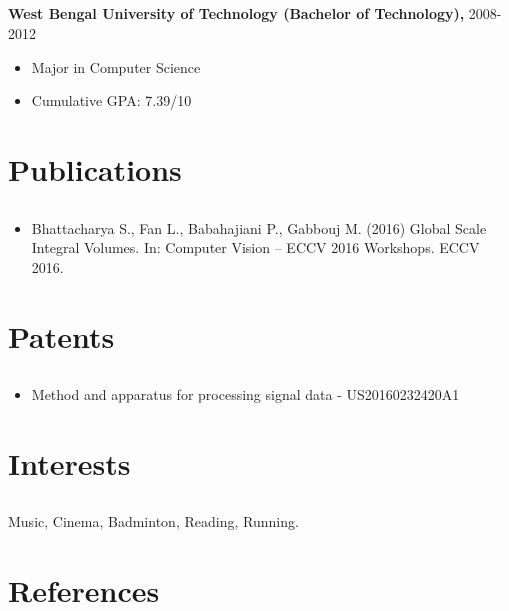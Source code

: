 \documentclass{article}
\begin{document}
\subsection{}
\textbf{West Bengal University of Technology (Bachelor of Technology),} 2008-2012
\begin{itemize}[label={--}]
  \itemsep0em 
  \item Major in Computer Science
  \item Cumulative GPA: 7.39/10
\end{itemize}


\section{Publications}
\subsection{}
\begin{itemize}[label={--}]
  \itemsep0em 
  \item Bhattacharya S., Fan L., Babahajiani P., Gabbouj M. (2016) Global Scale
    Integral Volumes. In: Computer Vision – ECCV 2016 Workshops. ECCV 2016.
\end{itemize}

\section{Patents}
\subsection{}
\begin{itemize}[label={--}]
  \itemsep0em 
  \item Method and apparatus for processing signal data - US20160232420A1
\end{itemize}

\section{Interests}
\subsection{}
Music, Cinema, Badminton, Reading, Running.
\subsection{}


\section{References}
\end{document}
